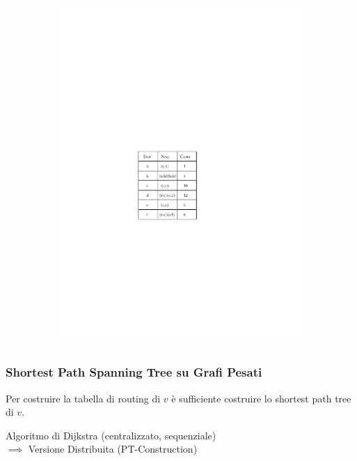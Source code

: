 \documentclass[10pt,xcolor=dvipsnames]{beamer}
\begin{document}
\begin{frame}
\begin{figure}[h]
\begin{subfigure}[b]{0.6\textwidth}
			\hspace*{2cm}\includegraphics[scale=0.8]{routing_table_global.pdf}
		\end{subfigure}
	\end{figure}
\end{frame}

\begin{frame}
	\frametitle{Shortest Path Spanning Tree su Grafi Pesati}
	Per costruire la tabella di routing di $v$ è sufficiente costruire lo shortest path tree di $v$.
	\vfill

	\pause
	Algoritmo di Dijkstra (centralizzato, sequenziale) 
	\pause
	\\$\implies$ Versione Distribuita (PT-Construction)
\end{frame}
\end{document}
